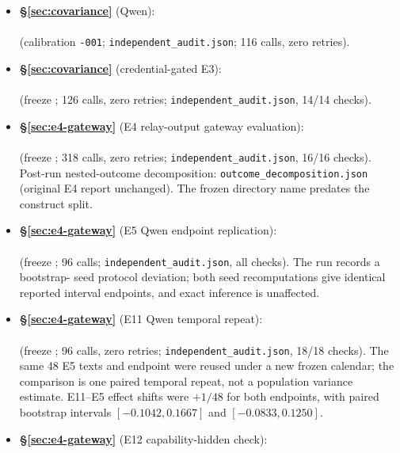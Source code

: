{\begin{itemize}
  \texttt{independent\_verification.json}).
  \item \textbf{\S\ref{sec:covariance}} (Qwen):\\
  \\
  (calibration \texttt{-001};
  \texttt{independent\_audit.json}; 116 calls, zero retries).
  \item \textbf{\S\ref{sec:covariance}} (credential-gated E3):\\
  \\
  (freeze ; 126 calls,
  zero retries; \texttt{independent\_audit.json}, 14/14 checks).
  \item \textbf{\S\ref{sec:e4-gateway}} (E4 relay-output gateway evaluation):\\
  \\
  (freeze ; 318 calls,
  zero retries; \texttt{independent\_audit.json}, 16/16 checks). Post-run
  nested-outcome decomposition: \texttt{outcome\_decomposition.json}
  (original E4 report unchanged). The frozen directory name predates the
  construct split.
  \item \textbf{\S\ref{sec:e4-gateway}} (E5 Qwen endpoint replication):\\
  \\
  (freeze ; 96 calls;
  \texttt{independent\_audit.json}, all checks). The run records a bootstrap-
  seed protocol deviation; both seed recomputations give identical reported
  interval endpoints, and exact inference is unaffected.
  \item \textbf{\S\ref{sec:e4-gateway}} (E11 Qwen temporal repeat):\\
  \\
  (freeze ; 96 calls, zero retries;
  \texttt{independent\_audit.json}, 18/18 checks). The same 48 E5 texts and
  endpoint were reused under a new frozen calendar; the comparison is one
  paired temporal repeat, not a population variance estimate. E11--E5 effect
  shifts were $+1/48$ for both endpoints, with paired bootstrap intervals
  $[-0.1042,0.1667]$ and $[-0.0833,0.1250]$.
  \item \textbf{\S\ref{sec:e4-gateway}} (E12 capability-hidden check):\\
  \\

\end{itemize}}
